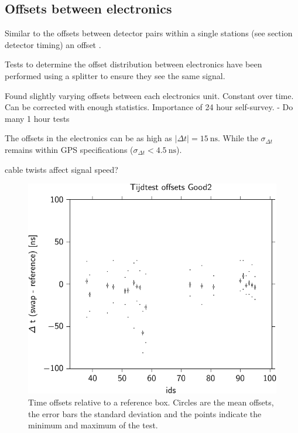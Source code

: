 \subsection{Offsets between \hisparc electronics}
\label{sub:gps_offsets}

Similar to the offsets between detector pairs within a single stations (see section detector timing) an offset .

Tests to determine the offset distribution between \hisparc electronics have been performed using a \gps splitter to ensure they see the same \gps signal.

Found slightly varying offsets between each \hisparc electronics unit. Constant over time. Can be corrected with enough statistics. Importance of 24 hour self-survey. - Do many 1 hour tests


The offsets in the \hisparc electronics can be as high as $|\Delta t| = \SI{15}{\ns}$. While the $\sigma_{\Delta t}$ remains within GPS specifications ($\sigma_{\Delta t} < \SI{4.5}{\ns}$).


\gps cable twists affect signal speed?

\begin{figure}
    \centering
    \includegraphics{plots/calibration/hisparc_offsets}
    \caption{Time offsets relative to a reference box. Circles are the
             mean offsets, the error bars the standard deviation and the
             points indicate the minimum and maximum of the test.}
    \label{fig:hisparc_offsets}
\end{figure}


